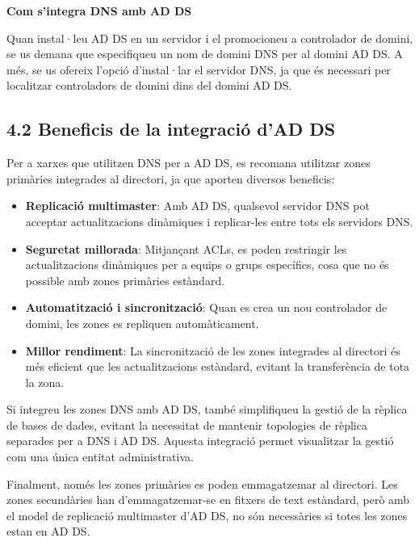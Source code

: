 \documentclass[
  a4paper,
]{article}
\begin{document}
\textbf{Com s'integra DNS amb AD DS}

Quan instal·leu AD DS en un servidor i el promocioneu a controlador de
domini, se us demana que especifiqueu un nom de domini DNS per al domini
AD DS. A més, se us ofereix l'opció d'instal·lar el servidor DNS, ja que
és necessari per localitzar controladors de domini dins del domini AD
DS.

\subsection{4.2 Beneficis de la integració d'AD
DS}\label{beneficis-de-la-integraciuxf3-dad-ds}

Per a xarxes que utilitzen DNS per a AD DS, es recomana utilitzar zones
primàries integrades al directori, ja que aporten diversos beneficis:

\begin{itemize}
\item
  \textbf{Replicació multimaster}: Amb AD DS, qualsevol servidor DNS pot
  acceptar actualitzacions dinàmiques i replicar-les entre tots els
  servidors DNS.
\item
  \textbf{Seguretat millorada}: Mitjançant ACLs, es poden restringir les
  actualitzacions dinàmiques per a equips o grups específics, cosa que
  no és possible amb zones primàries estàndard.
\item
  \textbf{Automatització i sincronització}: Quan es crea un nou
  controlador de domini, les zones es repliquen automàticament.
\item
  \textbf{Millor rendiment}: La sincronització de les zones integrades
  al directori és més eficient que les actualitzacions estàndard,
  evitant la transferència de tota la zona.
\end{itemize}

Si integreu les zones DNS amb AD DS, també simplifiqueu la gestió de la
rèplica de bases de dades, evitant la necessitat de mantenir topologies
de rèplica separades per a DNS i AD DS. Aquesta integració permet
visualitzar la gestió com una única entitat administrativa.

Finalment, només les zones primàries es poden emmagatzemar al directori.
Les zones secundàries han d'emmagatzemar-se en fitxers de text
estàndard, però amb el model de replicació multimaster d'AD DS, no són
necessàries si totes les zones estan en AD DS.
\end{document}
